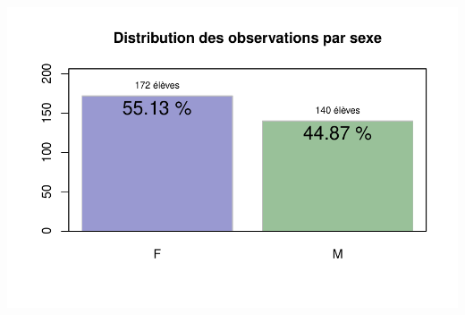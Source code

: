 \documentclass[11pt]{article}
\begin{document}
\begin{center}
\includegraphics{chik_analyse_pour_madsen-003}
\end{center}
\end{document}
